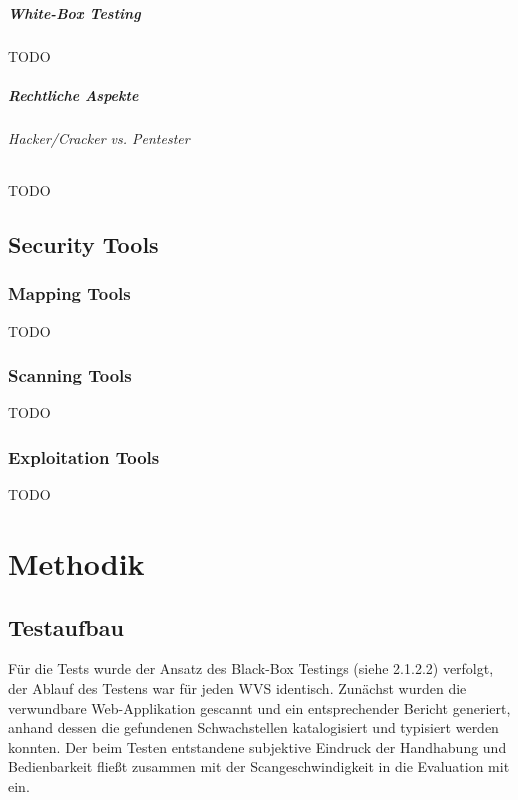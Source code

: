 \documentclass[12pt,oneside,a4paper,parskip]{scrbook}
\begin{document}
    \paragraph{White-Box Testing}
    TODO
    \paragraph{Rechtliche Aspekte}
      \subparagraph{Hacker/Cracker vs. Pentester}
      TODO

  \section{Security Tools}
    \subsection{Mapping Tools}
    TODO
    \subsection{Scanning Tools}
    TODO
    \subsection{Exploitation Tools}
    TODO

\chapter{Methodik}
  \section{Testaufbau}
  Für die Tests wurde der Ansatz des Black-Box Testings (siehe 2.1.2.2) verfolgt, der Ablauf des Testens war für jeden WVS identisch.
  Zunächst wurden die verwundbare Web-Applikation gescannt und ein entsprechender Bericht generiert, anhand dessen die gefundenen Schwachstellen katalogisiert und typisiert werden konnten. Der beim Testen entstandene subjektive Eindruck der Handhabung und Bedienbarkeit fließt zusammen mit der Scangeschwindigkeit in die Evaluation mit ein. %
\end{document}
